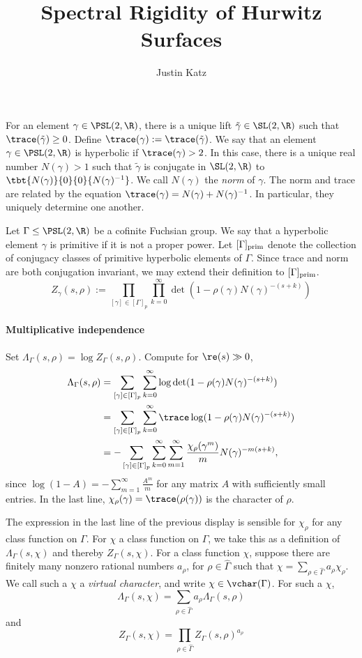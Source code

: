 \documentclass[11pt]{amsart}
\title{Spectral Rigidity of Hurwitz Surfaces}
\author{Justin Katz}
\theoremstyle{definition}
\theoremstyle{plain}
\theoremstyle{remark}
\begin{document}
\maketitle

For an element $\gamma \in \PSL(2,\R)$, there is a unique lift $\tilde{\gamma} \in \SL(2,\R)$ such that $\trace(\tilde{\gamma})\geq 0$.
Define $\trace(\gamma):= \trace(\tilde{\gamma})$.
We say that an element $\gamma \in \PSL(2,\R)$ is hyperbolic if $\trace(\gamma)>2$.
In this case, there is a unique real number $N(\gamma)>1$ such that $\tilde{\gamma}$ is conjugate in $\SL(2,\R)$ to $\tbt{N(\gamma)}{0}{0}{N(\gamma)^{-1}}$.
We call $N(\gamma)$ the \emph{norm} of $\gamma$.
The norm and trace are related by the equation $\trace(\gamma)=N(\gamma)+N(\gamma)^{-1}$.
In particular, they uniquely determine one another.

Let $\Gamma \leq \PSL(2,\R)$ be a cofinite Fuchsian group.
We say that a hyperbolic element $\gamma$ is primitive if it is not a proper power.
Let $[\Gamma]_{{\rm prim}}$ denote the collection of conjugacy classes of primitive hyperbolic elements of $\Gamma$.
Since trace and norm are both conjugation invariant, we may extend their definition to $[\Gamma]_{{\rm prim}}$.
\[ Z_{\gamma}(s,\rho):= \prod_{[\gamma]\in [\Gamma]_{p}}\prod_{k=0}^{\infty}\det(1-\rho(\gamma)N(\gamma)^{-(s+k)}) \]

\paragraph{Multiplicative independence}


Set $\Lambda_\Gamma(s,\rho)=\log Z_\Gamma(s,\rho)$.
Compute for $\re(s)\gg 0$,
\begin{align*}
	\Lambda_\Gamma(s,\rho) & =\sum_{[\gamma]\in [\Gamma]_p} \sum_{k=0}^\infty \log \det (1-\rho(\gamma)N(\gamma)^{-(s+k)})                        \\
	                       & =\sum_{[\gamma]\in [\Gamma]_p} \sum_{k=0}^\infty \trace \log (1-\rho(\gamma)N(\gamma)^{-(s+k)})                      \\
	                       & =-\sum_{[\gamma]\in [\Gamma]_p} \sum_{k=0}^\infty\sum_{m=1}^\infty \frac{\chi_\rho(\gamma^m)}{m}N(\gamma)^{-m(s+k)},
\end{align*}
since $\log(1-A)=-\sum_{m=1}^\infty \frac{A^m}{m}$ for any matrix $A$ with sufficiently small entries.
In the last line, $\chi_\rho(\gamma)=\trace(\rho(\gamma))$ is the character of $\rho$.

The expression in the last line of the previous display is sensible for $\chi_\rho$ for any class function on $\Gamma$.
For $\chi$ a class function on $\Gamma$, we take this as a definition of $\Lambda_\Gamma(s,\chi)$ and thereby $Z_\Gamma(s,\chi)$.
For a class function $\chi$, suppose there are finitely many nonzero rational numbers $a_\rho$, for $\rho \in \hat{\Gamma}$ such that  $\chi=\sum_{\rho \in \hat{\Gamma}}a_\rho \chi_\rho$.
We call such a $\chi$ a \emph{virtual character}, and write $\chi \in \vchar(\Gamma)$.
For such a $\chi$,
\[ \Lambda_\Gamma(s,\chi)=\sum_{\rho\in \hat{\Gamma}} a_\rho \Lambda_\Gamma(s,\rho) \]
and
\[ Z_\Gamma(s,\chi)=\prod_{\rho\in \hat{\Gamma}} Z_\Gamma(s,\rho)^{a_\rho} \]
\end{document}
